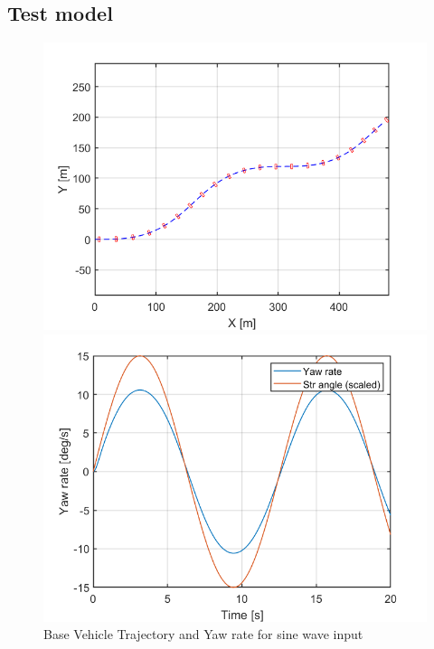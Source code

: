 \subsection{Test model }
\begin{figure}[H]
      \begin{minipage}[b]{0.5\linewidth}
      \centering
        \includegraphics[width=\linewidth]{Figures/1_3_XY.png}
    \end{minipage} 
    \begin{minipage}[b]{0.5\linewidth}
    \centering
        \includegraphics[width=\linewidth]{Figures/1_3_yaw.png}
    \end{minipage} 
    \caption{Base Vehicle Trajectory and Yaw rate for sine wave input}
\end{figure}

